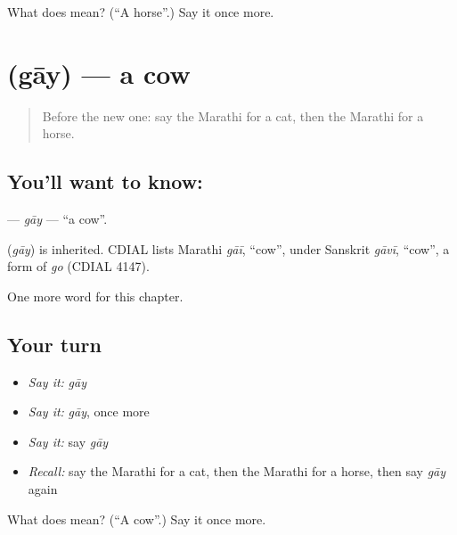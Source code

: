 \begin{tcolorbox}[breakable,colback=teal!4,colframe=teal!35!black,title={Before you move on}]
What does  mean? (\textquotedblleft{}A horse\textquotedblright{}.) Say it once more.
\end{tcolorbox}
\section[\texorpdfstring{\mr{गाय} (gāy)}{गाय (gāy)}]{ (gāy) — a cow}

\label{lesson:MR-C100-gay}



\begin{quote}
Before the new one: say the Marathi for a cat, then the Marathi for a horse.
\end{quote}

\subsection*{You'll want to know: }
\textbf{} — \emph{gāy} — \textquotedblleft{}a cow\textquotedblright{}.

\begin{cousinweb}
\textbf{} (\emph{gāy}) is inherited. CDIAL lists Marathi \emph{gāī}, \textquotedblleft{}cow\textquotedblright{}, under Sanskrit \emph{gāvī}, \textquotedblleft{}cow\textquotedblright{}, a form of \emph{go} (CDIAL 4147).
\end{cousinweb}

\begin{grammarlens}[title={What you've built}]
One more word for this chapter.
\end{grammarlens}

\subsection*{Your turn}
\begin{itemize}
\raggedright
  \item \emph{Say it:} \emph{gāy}
  \item \emph{Say it:} \emph{gāy}, once more
  \item \emph{Say it:} say \emph{gāy}
  \item \emph{Recall:} say the Marathi for a cat, then the Marathi for a horse, then say \emph{gāy} again
\end{itemize}

\begin{tcolorbox}[breakable,colback=teal!4,colframe=teal!35!black,title={Before you move on}]
What does  mean? (\textquotedblleft{}A cow\textquotedblright{}.) Say it once more.
\end{tcolorbox}
